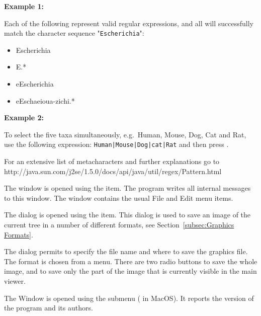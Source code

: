 \documentclass[11pt]{article}
\begin{document}
{\bf Example 1:}

Each of the following represent valid regular expressions, and all will successfully
match the character sequence "\texttt{Escherichia}":
\begin{itemize}
\item Escherichia
\item E.*
\item \lbrack eE\rbrack scherichia
\item \lbrack eE\rbrack sch\lbrack aeiou\rbrack \lbrack a-z\rbrack ichi.*
\end{itemize}

{\bf Example 2:}

To select the five taxa simultaneously, e.g.\ Human, Mouse, Dog, Cat and Rat,
use the following expression: {\tt Human|Mouse|Dog|cat|Rat} and then press .

For an extensive list of metacharacters and further explanations go to http://java.sun.com/j2se/1.5.0/docs/api/java/util/regex/Pattern.html



The  window is opened using the
 item.
The program writes all internal messages to this window.
The window contains the usual File and Edit menu items.

 \label{openexportimagedialog}
The  dialog is opened using the
 item.
This dialog is used to save an image of the current tree
in a number of different formats, see Section~\ref{subsec:Graphics Formats}. 

The dialog permits to specify the file name and  where to save the graphics file.
The format is chosen from a menu.
There are two radio buttons 
to save the whole image, and  to save
only the part of the image that is currently visible in the main viewer.


The  Window is opened using the
 submenu ( in MacOS). It reports the version of the program and its authors.
\end{document}
